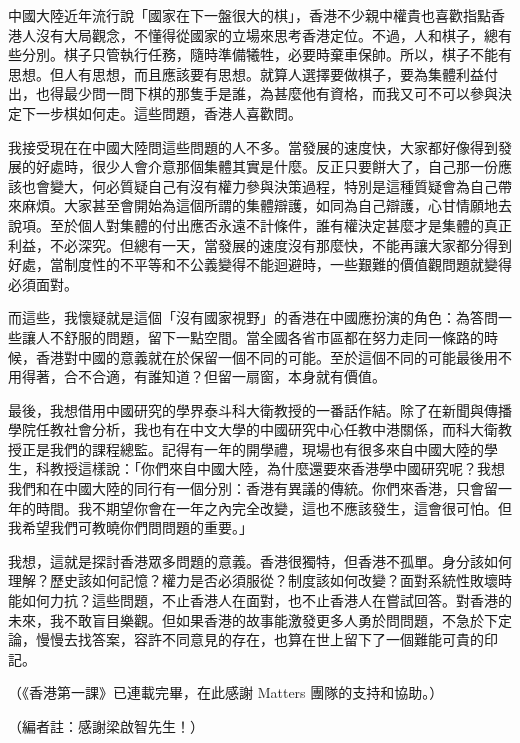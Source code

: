 中國大陸近年流行說「國家在下一盤很大的棋」，香港不少親中權貴也喜歡指點香港人沒有大局觀念，不懂得從國家的立場來思考香港定位。不過，人和棋子，總有些分別。棋子只管執行任務，隨時準備犧牲，必要時棄車保帥。所以，棋子不能有思想。但人有思想，而且應該要有思想。就算人選擇要做棋子，要為集體利益付出，也得最少問一問下棋的那隻手是誰，為甚麼他有資格，而我又可不可以參與決定下一步棋如何走。這些問題，香港人喜歡問。

我接受現在在中國大陸問這些問題的人不多。當發展的速度快，大家都好像得到發展的好處時，很少人會介意那個集體其實是什麼。反正只要餅大了，自己那一份應該也會變大，何必質疑自己有沒有權力參與決策過程，特別是這種質疑會為自己帶來麻煩。大家甚至會開始為這個所謂的集體辯護，如同為自己辯護，心甘情願地去說項。至於個人對集體的付出應否永遠不計條件，誰有權決定甚麼才是集體的真正利益，不必深究。但總有一天，當發展的速度沒有那麼快，不能再讓大家都分得到好處，當制度性的不平等和不公義變得不能迴避時，一些艱難的價值觀問題就變得必須面對。

而這些，我懷疑就是這個「沒有國家視野」的香港在中國應扮演的角色：為答問一些讓人不舒服的問題，留下一點空間。當全國各省市區都在努力走同一條路的時候，香港對中國的意義就在於保留一個不同的可能。至於這個不同的可能最後用不用得著，合不合適，有誰知道？但留一扇窗，本身就有價值。

最後，我想借用中國研究的學界泰斗科大衛教授的一番話作結。除了在新聞與傳播學院任教社會分析，我也有在中文大學的中國研究中心任教中港關係，而科大衛教授正是我們的課程總監。記得有一年的開學禮，現場也有很多來自中國大陸的學生，科教授這樣說：「你們來自中國大陸，為什麼還要來香港學中國研究呢？我想我們和在中國大陸的同行有一個分別：香港有異議的傳統。你們來香港，只會留一年的時間。我不期望你會在一年之內完全改變，這也不應該發生，這會很可怕。但我希望我們可教曉你們問問題的重要。」

我想，這就是探討香港眾多問題的意義。香港很獨特，但香港不孤單。身分該如何理解？歷史該如何記憶？權力是否必須服從？制度該如何改變？面對系統性敗壞時能如何力抗？這些問題，不止香港人在面對，也不止香港人在嘗試回答。對香港的未來，我不敢盲目樂觀。但如果香港的故事能激發更多人勇於問問題，不急於下定論，慢慢去找答案，容許不同意見的存在，也算在世上留下了一個難能可貴的印記。



（《香港第一課》已連載完畢，在此感謝 Matters 團隊的支持和協助。）

（編者註：感謝梁啟智先生！）